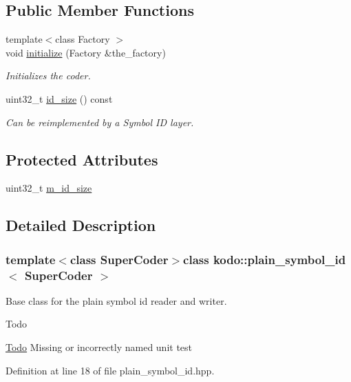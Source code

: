 \subsection*{Public Member Functions}
\begin{DoxyCompactItemize}
\item 
{\footnotesize template$<$class Factory $>$ }\\void \hyperlink{classkodo_1_1plain__symbol__id_a8d37451a9774e071ee755aa0141661d9}{initialize} (Factory \&the\-\_\-factory)
\begin{DoxyCompactList}\small\item\em Initializes the coder. \end{DoxyCompactList}\item 
uint32\-\_\-t \hyperlink{classkodo_1_1plain__symbol__id_acde4b5941f7398e7b24bc4823bcbec9b}{id\-\_\-size} () const 
\begin{DoxyCompactList}\small\item\em Can be reimplemented by a Symbol I\-D layer. \end{DoxyCompactList}\end{DoxyCompactItemize}
\subsection*{Protected Attributes}
\begin{DoxyCompactItemize}
\item 
uint32\-\_\-t \hyperlink{classkodo_1_1plain__symbol__id_a2ebdf14dae4af1b60b7d0acbe00848d7}{m\-\_\-id\-\_\-size}
\end{DoxyCompactItemize}


\subsection{Detailed Description}
\subsubsection*{template$<$class Super\-Coder$>$class kodo\-::plain\-\_\-symbol\-\_\-id$<$ Super\-Coder $>$}

Base class for the plain symbol id reader and writer. 

\begin{DoxyRefDesc}{Todo}
\item[\hyperlink{todo__todo000035}{Todo}]Missing or incorrectly named unit test\end{DoxyRefDesc}


Definition at line 18 of file plain\-\_\-symbol\-\_\-id.\-hpp.



